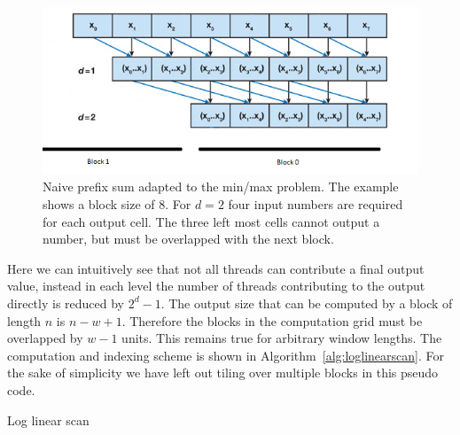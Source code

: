 \begin{figure}[h]
    \centering
    \includegraphics[width=0.8\linewidth]{Figures/prefix2}
    \caption{Naive prefix sum adapted to the min/max problem. The example shows a block size of 8. For $d=2$ four input numbers are required for each output cell. The three left most cells cannot output a number, but must be overlapped with the next block.}
    \label{fig:prefixsum2}
\end{figure}

Here we can intuitively see that not all threads can contribute a final output value, instead in each level the number of threads contributing to the output directly is reduced by $2^d-1$. The output size that can be computed by a block of length $n$ is $n - w + 1$. Therefore the blocks in the computation grid must be overlapped by $w - 1$ units. This remains true for arbitrary window lengths. The computation and indexing scheme is shown in Algorithm~\ref{alg:loglinearscan}. For the sake of simplicity we have left out tiling over multiple blocks in this pseudo code.

\begin{algorithm}[h]
    \caption{Log linear scan}
    \label{alg:loglinearscan}
\end{algorithm}


